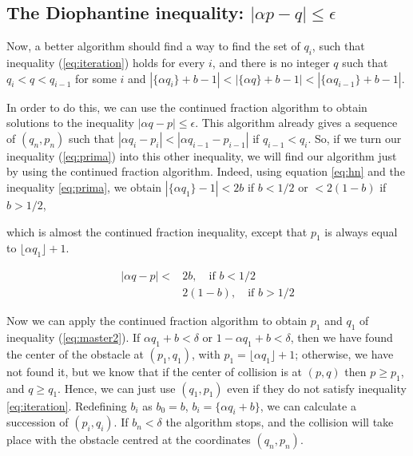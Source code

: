 \documentclass{iopart}
\newcommand{\eqref}[1]{(\ref{#1})}
\begin{document}
\subsection{The Diophantine inequality: $|\alpha p - q|\leq \epsilon$}

Now, a better algorithm should find a way to find the set of $q_i$, such that inequality \eqref{eq:iteration} holds for every $i$, and there is no integer $q$  such that $q_i<q<q_{i-1}$ for some $i$ and
$|\{ \alpha  q_i \}+b -1|<|\{ \alpha  q \}+b -1| <|\{ \alpha  q_{i-1} \}+b -1|$. 

In order to do this, we can use the continued fraction algorithm to obtain solutions to the inequality $|\alpha q - p|\leq \epsilon$. This algorithm already gives a sequence of $(q_n,p_n)$ such that $|\alpha q_i - p_i|<|\alpha q_{i-1} - p_{i-1}|$ if $q_{i-1} <q_i$. So, if we turn our inequality \eqref{eq:prima} into this other inequality, we will find our algorithm just by using the continued fraction algorithm.
Indeed, using equation \ref{eq:hn} and the inequality \ref{eq:prima}, we obtain $|\{ \alpha  q_1 \} -1|< 2b$ if $b < 1/2$ or $<  2(1-b)$  if $b > 1/2$, 

which is almost the continued fraction inequality, except that $p_1$ is always equal to $\lfloor \alpha q_1  \rfloor+1$. 


\begin{eqnarray}
|\alpha  q-p|<  & 2b, \quad \mbox{if } b < 1/2 \\ 
& 2(1-b), \quad  \mbox{if }  b > 1/2 %
\label{eq:master2}
\end{eqnarray}


Now we can apply the continued fraction algorithm to obtain $p_1$ and $q_1$ of inequality \eqref{eq:master2}.  If ${\alpha q_1+b} < \delta$ or $1-{\alpha q_1+b} < \delta$, then we have found the center of the obstacle at $(p_1,q_1)$, with  $p_1=\lfloor \alpha q_1  \rfloor+1$; otherwise, we have not found it, but we know that if the center of collision is at $(p,q)$ then
$p\geq p_1$, and $q \geq q_1$. Hence, we can just use $(q_1,p_1)$ even if they do not satisfy inequality \ref{eq:iteration}. Redefining $b_i$ as $b_0=b$, $b_i=\{\alpha q_i+b\}$, we can calculate a succession of $(p_i,q_i)$. If $b_n<\delta$ the algorithm stops, and the collision will take place with the obstacle centred at the coordinates $(q_n,p_n)$.
\end{document}
